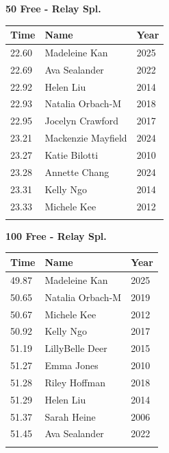 \vspace{1.2em}
\noindent\begin{minipage}[t]{0.48\textwidth}
\centering
\textbf{\textcolor{teamprimary}{50 Free - Relay Spl.}}\par
\vspace{0.5em}
\centering
\small
\renewcommand{\arraystretch}{1.0}
\setlength{\tabcolsep}{4pt}
\begin{tabular}{@{}p{1.8cm}p{3.0cm}p{1.0cm}@{}}
\toprule
\textbf{Time} & \textbf{Name} & \textbf{Year} \\
\midrule
22.60 & Madeleine Kan & 2025 \\
22.69 & Ava Sealander & 2022 \\
22.92 & Helen Liu & 2014 \\
22.93 & Natalia Orbach-M & 2018 \\
22.95 & Jocelyn Crawford & 2017 \\
23.21 & Mackenzie Mayfield & 2024 \\
23.27 & Katie Bilotti & 2010 \\
23.28 & Annette Chang & 2024 \\
23.31 & Kelly Ngo & 2014 \\
23.33 & Michele Kee & 2012 \\
\bottomrule
\vspace{0.5em}
\end{tabular}
\end{minipage}
\hfill
\begin{minipage}[t]{0.48\textwidth}
\centering
\textbf{\textcolor{teamprimary}{100 Free - Relay Spl.}}\par
\vspace{0.5em}
\centering
\small
\renewcommand{\arraystretch}{1.0}
\setlength{\tabcolsep}{4pt}
\begin{tabular}{@{}p{1.8cm}p{3.0cm}p{1.0cm}@{}}
\toprule
\textbf{Time} & \textbf{Name} & \textbf{Year} \\
\midrule
49.87 & Madeleine Kan & 2025 \\
50.65 & Natalia Orbach-M & 2019 \\
50.67 & Michele Kee & 2012 \\
50.92 & Kelly Ngo & 2017 \\
51.19 & LillyBelle Deer & 2015 \\
51.27 & Emma Jones & 2010 \\
51.28 & Riley Hoffman & 2018 \\
51.29 & Helen Liu & 2014 \\
51.37 & Sarah Heine & 2006 \\
51.45 & Ava Sealander & 2022 \\
\bottomrule
\vspace{0.5em}
\end{tabular}
\end{minipage}
